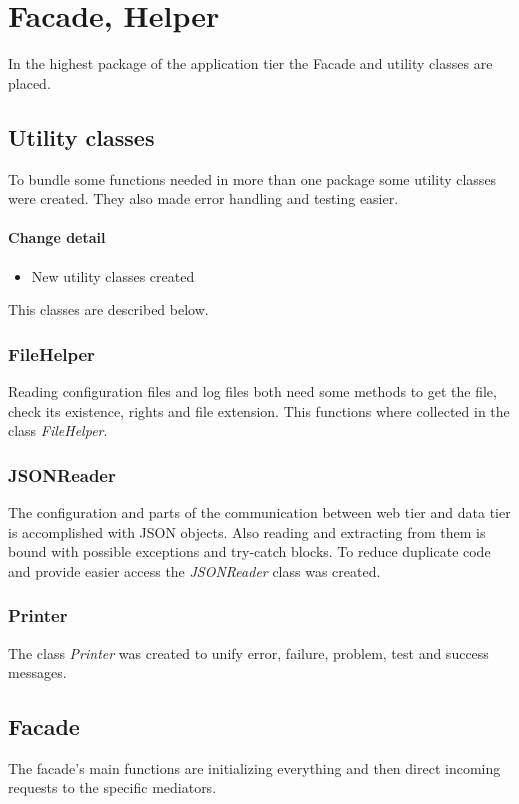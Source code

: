 \section{Facade, Helper}
In the highest package of the application tier the
Facade and utility classes are placed.

\subsection{Utility classes}\label{utility}
To bundle some functions needed in more than one package some utility
classes were created. They also made error handling and 
testing easier. 

\paragraph{Change detail}
\begin{itemize}
  \item New utility classes created
\end{itemize}

This classes are described below.

\subsubsection{FileHelper}\label{FileHelper}
Reading configuration files and log files both need some methods to get the file,
check its existence, rights and file extension. This functions
where collected in the class \textit{FileHelper}.

\subsubsection{JSONReader}\label{reader}
The configuration and parts of the communication between web tier
and data tier is accomplished with JSON objects. Also reading and
extracting from them is bound with possible exceptions and try-catch blocks.
To reduce duplicate code and provide easier access the \textit{JSONReader} class
was created.

\subsubsection{Printer}
The class \textit{Printer} was created to unify error, failure, problem, test
and success messages.


\subsection{Facade}
The facade's main functions are initializing everything and then direct incoming requests to
the specific mediators. 

